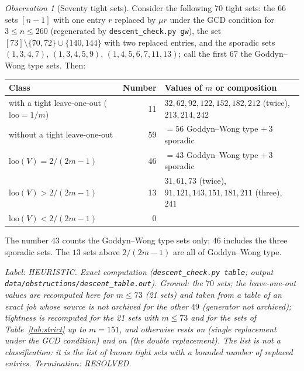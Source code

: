\documentclass[11pt]{article}
\theoremstyle{remark}
\newtheorem{observation}[theorem]{Observation}
\newcommand{\loo}{\mathrm{loo}}
\newcommand{\lab}[1]{\par\smallskip\noindent\textit{Label: #1.}}
\begin{document}
\begin{observation}[Seventy tight sets]\label{obs:tight70}
Consider the following $70$ tight sets: the $66$ sets $[n-1]$ with one entry $r$ replaced by $\mu r$ under the GCD condition for $3\le n\le260$ (regenerated by \texttt{descent\_check.py gw}), the set $[73]\setminus\{70,72\}\cup\{140,144\}$ with two replaced entries, and the sporadic sets $(1,3,4,7)$, $(1,3,4,5,9)$, $(1,4,5,6,7,11,13)$; call the first $67$ the Goddyn--Wong type sets. Then:
\begin{center}\footnotesize
\begin{tabular}{@{}p{5.6cm}rp{5.6cm}@{}}
\toprule
Class & Number & Values of $m$ or composition\\
\midrule
with a tight leave-one-out ($\loo=1/m$) & 11 & $32,62,92,122,152,182,212$ (twice), $213,214,242$\\
without a tight leave-one-out & 59 & $=56$ Goddyn--Wong type $+\,3$ sporadic\\
\quad $\loo(V)=2/(2m-1)$ & 46 & $=43$ Goddyn--Wong type $+\,3$ sporadic\\
\quad $\loo(V)>2/(2m-1)$ & 13 & $31,61,73$ (twice), $91,121,143,151,181,211$ (three), $241$\\
\quad $\loo(V)<2/(2m-1)$ & 0 & \\
\bottomrule
\end{tabular}
\end{center}
The number $43$ counts the Goddyn--Wong type sets only; $46$ includes the three sporadic sets. The $13$ sets above $2/(2m-1)$ are all of Goddyn--Wong type.
\end{observation}
\lab{HEURISTIC. Exact computation (\texttt{descent\_check.py table}; output \texttt{data/obstructions/descent\_table.out}). Ground: the $70$ sets; the leave-one-out values are recomputed here for $m\le73$ (21 sets) and taken from a table of an exact job whose source is not archived for the other $49$ (generator not archived); tightness is recomputed for the 21 sets with $m\le73$ and for the sets of Table~\ref{tab:strict} up to $m=151$, and otherwise rests on \cite[Thm.~3.1]{GW06} (single replacement under the GCD condition) and on \cite{Zhang26} (the double replacement). The list is not a classification: it is the list of known tight sets with a bounded number of replaced entries. Termination: RESOLVED}
\end{document}

